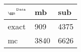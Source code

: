 \begin{tabular}{lll}
    \toprule
    $_{\text{\tiny{\ggn}}}$$^{\text{\tiny{Data}}}$ & mb & sub \\
    \midrule
    exact & 909
              & 4375 \\
    mc   & 3840
              & 6626 \\
    \bottomrule
\end{tabular}